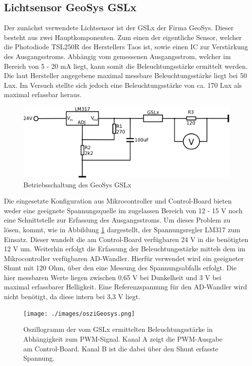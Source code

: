 \documentclass[a4paper,12pt]{scrartcl}
\begin{document}
\subsection{Lichtsensor GeoSys GSLx}
\label{sec:HardwareGSLx}
Der zunächst verwendete Lichtsensor ist der GSLx der Firma GeoSys. Dieser besteht aus zwei Hauptkomponenten. Zum einen der eigentliche Sensor, welcher die Photodiode TSL250R des Herstellers Taos ist, sowie einen IC zur Verstärkung des Ausgangsstroms. Abhängig vom gemessenen Ausgangsstrom, welcher im Bereich von 5 - 20 mA liegt, kann somit die Beleuchtungsstärke ermittelt werden. Die laut Hersteller angegebene maximal messbare Beleuchtungsstärke liegt bei 50 Lux. Im Versuch stellte sich jedoch eine Beleuchtungsstärke von ca. 170 Lux als maximal erfassbar heraus.

\begin{figure}[H]
\begin{center}
\includegraphics[width=0.7\hsize]{./schematics/geosys2.png}
\end{center}
\caption{\label{fig:schaltplangslx}Betriebsschaltung des GeoSys GSLx}
\end{figure}

Die eingesetzte Konfiguration aus Mikrocontroller und Control-Board bieten weder eine geeignete Spannungsquelle im zugelassen Bereich von 12 - 15 V noch eine Schnittstelle zur Erfassung des Ausgangsstroms. Um dieses Problem zu lösen, kommt, wie in Abbildung \ref{fig:schaltplangslx} dargestellt, der Spannungsregler LM317 zum Einsatz. Dieser wandelt die am Control-Board verfügbaren 24 V in die benötigten 12 V um. Weiterhin erfolgt die Erfassung der Beleuchtungsstärke mittels dem im Mikrocontroller verfügbaren AD-Wandler. Hierfür verwendet wird ein geeigneter Shunt mit 120 Ohm, über den eine Messung des Spannungsabfalls erfolgt. Die hier messbaren Werte liegen zwischen 0,65 V bei Dunkelheit und 3 V bei maximal erfassbarer Helligkeit. Eine Referenzspannung für den AD-Wandler wird nicht benötigt, da diese intern bei 3,3 V liegt.

\begin{figure}[H]
\begin{center}
\texttt{[image: ./images/osziGeosys.png]}
\end{center}
\caption{\label{fig:gslOszi}Oszillogramm der vom GSLx ermittelten Beleuchtungsstärke in Abhängigkeit zum PWM-Signal. Kanal A zeigt die PWM-Ausgabe am Control-Board. Kanal B ist die dabei über den Shunt erfasste Spannung.}
\end{figure}
\end{document}
